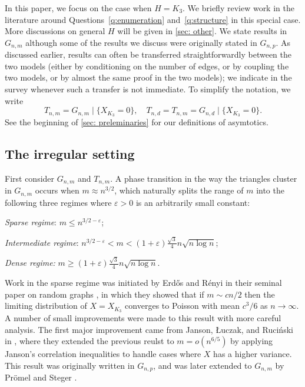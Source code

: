 \documentclass[11pt]{article}
\newcommand{\eps}{\varepsilon}
\theoremstyle{plain}
\begin{document}
In this paper, we focus on the case when $H=K_3$. We briefly review work in the literature around Questions~\ref{q:enumeration} and~\ref{q:structure} in this special case. More discussions on general $H$ will be given in \cref{sec: other}. We state  results in $G_{n,m}$ although some of the results we discuss were originally stated in $G_{n,p}$.  As discussed earlier, results can often be transferred straightforwardly between the two models (either by conditioning on the number of edges, or by coupling the two models, or by almost the same proof in the two models); we indicate in the survey whenever such a transfer is not immediate. To simplify the notation, we write
\[
T_{n,m}=G_{n,m}\mid\{X_{K_3}=0\},\quad T_{n,d}=T_{n,m}=G_{n,d}\mid\{X_{K_3}=0\}.
\]
See the beginning of \cref{sec: preleminaries} for our definitions of asymtotics.

\subsection{The irregular setting}\label{sec: irregular}


First consider $G_{n,m}$ and $T_{n,m}$. A phase transition in the way the triangles cluster in $G_{n,m}$ occurs when $m\approx n^{3/2}$, which naturally splits the range of $m$ into the following three regimes where $\eps>0$ is an arbitrarily small constant:\smallskip


\begin{center}
\begin{minipage}{10cm}
\raggedright
\noindent\textit{Sparse regime}: $m \leq n^{3/2 - \eps}$;

\noindent\textit{Intermediate regime}:  $n^{3/2 - \eps}<m < (1+\eps) \frac{\sqrt 3}{4}n\sqrt{n \log n}$;

\noindent\textit{Dense regime:} $m \ge (1+\eps) \frac{\sqrt 3}{4}n\sqrt{n \log n}$. 

\end{minipage}
\end{center}


\smallskip

 Work in the sparse regime was initiated by Erd\H{o}s and R\'enyi in their seminal paper on random graphs \cite{erdos1960evolution}, in which they showed that if $m\sim cn/2$ then the limiting distribution of $X=X_{K_3}$ converges to  Poisson with mean $c^3/6$ as $n\to \infty$.  A number of small improvements were made to this result \cite{Bollobs_1981, Karonski1983} with more careful analysis. The first major improvement came from Janson, {\L}uczak, and Ruci\'nski in \cite{janson1988exponential}, where they extended the previous reulst to $m=o(n^{6/5})$ by applying Janson's correlation inequalities to handle cases where $X$ has a higher variance.  This result was originally written in $G_{n,p}$, and was later extended to $G_{n,m}$ by Pr\"omel and Steger \cite{PROMEL1996311}. 
\end{document}
